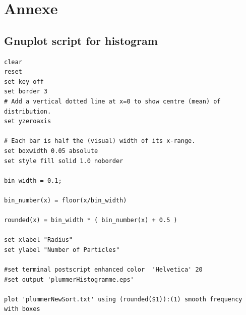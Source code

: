 \documentclass[10pt]{article}
\begin{document}
\newpage
\section{Annexe}
\subsection{Gnuplot script for histogram}
\begin{verbatim}
clear
reset
set key off
set border 3
# Add a vertical dotted line at x=0 to show centre (mean) of distribution.
set yzeroaxis

# Each bar is half the (visual) width of its x-range.
set boxwidth 0.05 absolute
set style fill solid 1.0 noborder

bin_width = 0.1;

bin_number(x) = floor(x/bin_width)

rounded(x) = bin_width * ( bin_number(x) + 0.5 )

set xlabel "Radius"
set ylabel "Number of Particles"

#set terminal postscript enhanced color  'Helvetica' 20
#set output 'plummerHistogramme.eps'

plot 'plummerNewSort.txt' using (rounded($1)):(1) smooth frequency with boxes
\end{verbatim}
\end{document}
